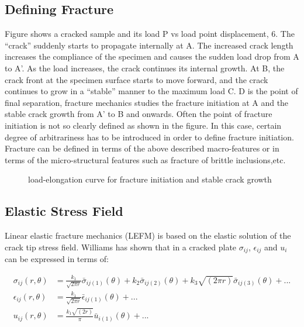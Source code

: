 \documentclass[12pt]{article}
\begin{document}
\subsection{Defining Fracture}Figure shows a cracked sample and its load P vs load point displacement, 6. The “crack” suddenly starts to propagate internally at A. The increased crack length increases the compliance of the specimen and causes the sudden load drop from A to A'. As the load increases, the crack continues its internal growth. At B, the crack front at the specimen surface starts to move forward, and the crack continues to grow in a “stable” manner to the maximum load C. D is the point of final separation, fracture mechanics studies the fracture initiation at A and the stable crack growth from A' to B and onwards. Often the point of fracture initiation is not so clearly defined as shown in the figure. In this case, certain degree of arbitrariness has to be introduced in order to define fracture initiation. Fracture can be defined in terms of the above described macro-features or in terms of the micro-structural features such as fracture of brittle inclusions,etc.
\begin{figure}[H]
    \centering
    \captionsetup{labelformat=empty}
    \caption{load-elongation curve for fracture initiation and stable crack growth}  
\end{figure}
\subsection{Elastic Stress Field}Linear elastic fracture mechanics (LEFM) is based on the elastic solution of the crack tip stress field. Williams has shown that in a cracked plate 
$\sigma_{ij}$, $\epsilon_{ij}$ and $u_i$ can be expressed in terms of:

\begin{align*}
    \sigma_{ij}(r, \theta) &= \frac{k_1}{\sqrt{2 \pi r}} \bar{\sigma}_{ij(1)}(\theta) + k_2 \bar{\sigma}_{ij(2)}(\theta) + k_3 \sqrt{(2 \pi r)}\bar{\sigma}_{ij(3)}(\theta) + ...
    \\\epsilon_{ij}(r, \theta) &= \frac{k_1}{\sqrt{2 \pi r}} \bar{\epsilon}_{ij(1)}(\theta) + ... \tag{1} \label{1}
    \\u_{ij}(r, \theta) &= \frac{k_1 \sqrt{(2 r)}}{\pi} \bar{u}_{i(1)}(\theta) + ...
\end{align*}
\begin{figure}[h]
    \begin{center}
    \end{center}
\end{figure}
\end{document}

